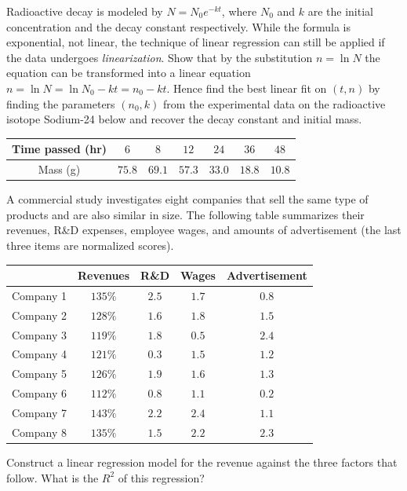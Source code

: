 \begin{Exercise}
Radioactive decay is modeled by $N = N_0e^{-kt}$, where $N_0$ and $k$ are the initial concentration and the decay constant respectively. While the formula is exponential, not linear, the technique of linear regression can still be applied if the data undergoes \textit{linearization}. Show that by the substitution $n = \ln N$ the equation can be transformed into a linear equation $n = \ln N = \ln N_0 - kt = n_0 - kt$. Hence find the best linear fit on $(t, n)$ by finding the parameters $(n_0, k)$ from the experimental data on the radioactive isotope Sodium-24 below and recover the decay constant and initial mass.
\begin{center}
\begin{tabular}{|c|c|c|c|c|c|c|}
\hline
Time passed (hr) & $6$ & $8$ & $12$ & $24$ & $36$ & $48$\\
\hline
Mass (g) & $75.8$ & $69.1$ & $57.3$ & $33.0$ & $18.8$ & $10.8$\\
\hline
\end{tabular}
\end{center}
\end{Exercise}

\begin{Exercise}
A commercial study investigates eight companies that sell the same type of products and are also similar in size. The following table summarizes their revenues, R\&D expenses, employee wages, and amounts of advertisement (the last three items are normalized scores).
\begin{center}
\begin{tabular}{|c|c|c|c|c|}
\hline
& Revenues & R\&D & Wages & Advertisement \\
\hline
Company 1 & $135\%$ & $2.5$ & $1.7$ & $0.8$ \\
\hline
Company 2 & $128\%$ & $1.6$ & $1.8$ & $1.5$ \\
\hline
Company 3 & $119\%$ & $1.8$ & $0.5$ & $2.4$ \\
\hline
Company 4 & $121\%$ & $0.3$ & $1.5$ & $1.2$ \\
\hline
Company 5 & $126\%$ & $1.9$ & $1.6$ & $1.3$ \\
\hline
Company 6 & $112\%$ & $0.8$ & $1.1$ & $0.2$ \\
\hline
Company 7 & $143\%$ & $2.2$ & $2.4$ & $1.1$ \\
\hline
Company 8 & $135\%$ & $1.5$ & $2.2$ & $2.3$ \\
\hline
\end{tabular}
\end{center}
Construct a linear regression model for the revenue against the three factors that follow. What is the $R^2$ of this regression?
\end{Exercise} 